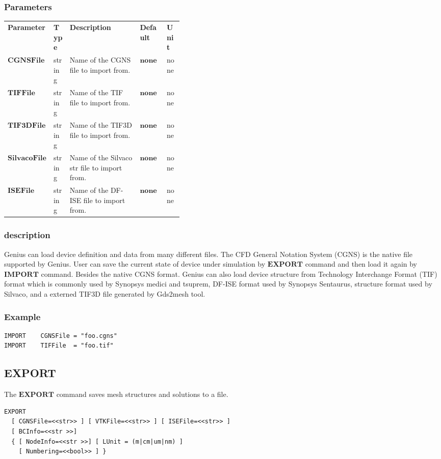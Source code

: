 \documentclass[oneside,12pt]{cgd_book}
\begin{document}
\subsubsection{Parameters}
\begin{longtable}{ll>{\raggedright}p{0.4\linewidth}ll}
\textbf{Parameter} & \textbf{Type} & \textbf{Description} & \textbf{Default} & \textbf{Unit} \\
$\mathbf{CGNSFile}$
& string
& Name of the CGNS file to import from.
& $\mathbf{none}$
& none
\\
 $\mathbf{TIFFile}$
& string
& Name of the TIF file to import from.
& $\mathbf{none}$
& none
\\
 $\mathbf{TIF3DFile}$
& string
& Name of the TIF3D file to import from.
& $\mathbf{none}$
& none
\\
 $\mathbf{SilvacoFile}$
& string
& Name of the Silvaco str file to import from.
& $\mathbf{none}$
& none
\\
 $\mathbf{ISEFile}$
& string
& Name of the DF-ISE file to import from.
& $\mathbf{none}$
& none\\
\end{longtable}

\par
\subsubsection{description}
Genius can load device definition and data from many different files. The CFD General Notation System
          (CGNS) is the native file supported by Genius. User can save the current state of device under simulation by
$\mathbf{EXPORT}$ command and then load it again by $\mathbf{IMPORT}$
command. Besides the
          native CGNS format. Genius can also load device structure from Technology Interchange Format (TIF) format
          which is commonly used by Synopsys medici and tsuprem, DF-ISE format used by Synopsys Sentaurus, structure
          format used by Silvaco, and a externed TIF3D file generated by Gds2mesh tool.
\par
\subsubsection{Example}
\begin{lstlisting}[style=GeniusCode]
IMPORT    CGNSFile = "foo.cgns"
IMPORT    TIFFile  = "foo.tif"
\end{lstlisting}
\par
\subsection{EXPORT}
The $\mathbf{EXPORT}$
command saves mesh structures and solutions to a file.
\par
\begin{lstlisting}[style=GeniusCmd]
EXPORT
  [ CGNSFile=<<str>> ] [ VTKFile=<<str>> ] [ ISEFile=<<str>> ]
  [ BCInfo=<<str >>]
  { [ NodeInfo=<<str >>] [ LUnit = (m|cm|um|nm) ]
    [ Numbering=<<bool>> ] }
\end{lstlisting}
\par
\end{document}
